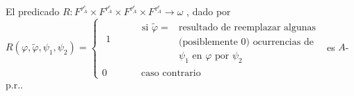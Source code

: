   \begin{lemma}
    El predicado \(R:F^{\tau _{A}^{e}}\times F^{\tau _{A}^{e}}\times F^{\tau _{A}^{e}}\times F^{\tau _{A}^{e}}\rightarrow \omega \) , dado por
    \(\displaystyle R(\varphi ,\tilde{\varphi},\psi _{1},\psi _{2})=\left\{ \begin{array}{cccl} \begin{array}{c} 1 \\ \; \\ \ \end{array} & & & \begin{array}{cl} \text{si }\tilde{\varphi}= & \text{resultado de reemplazar algunas} \\ & \text{(posiblemente }0\text{) ocurrencias de} \\ & \psi _{1}\text{ en }\varphi \text{ por }\psi _{2} \end{array} \\ 0 & & & \text{ caso contrario} \end{array} \right. \)
    es \(A\)-p.r..
  \end{lemma}
